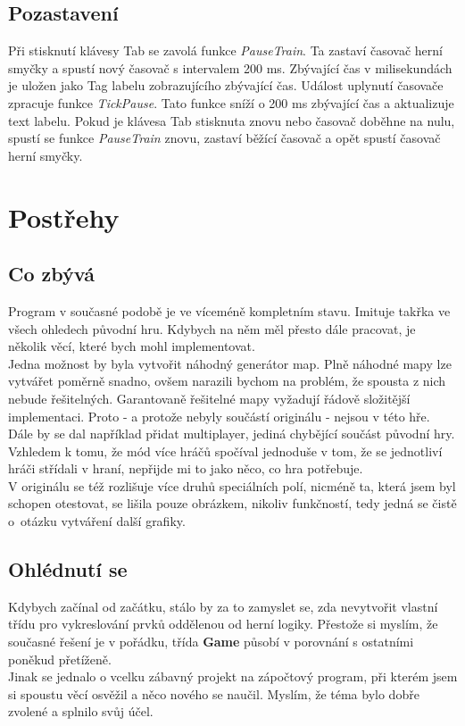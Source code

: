 \documentclass[11pt,a4paper]{scrreprt}
\begin{document}
\section{Pozastavení}
Při stisknutí klávesy Tab se zavolá funkce \textit{PauseTrain}. Ta zastaví časovač herní smyčky a spustí nový časovač s intervalem 200 ms. Zbývající čas v milisekundách je uložen jako Tag labelu zobrazujícího zbývající čas. Událost uplynutí časovače zpracuje funkce \textit{TickPause}. Tato funkce sníží o 200 ms zbývající čas a aktualizuje text labelu. Pokud je klávesa Tab stisknuta znovu nebo časovač doběhne na nulu, spustí se funkce \textit{PauseTrain} znovu, zastaví běžící časovač a opět spustí časovač herní smyčky.

\chapter{Postřehy}
\section{Co zbývá}
Program v současné podobě je ve víceméně kompletním stavu. Imituje takřka ve všech ohledech původní hru. Kdybych na něm měl přesto dále pracovat, je několik věcí, které bych mohl implementovat. \\

Jedna možnost by byla vytvořit náhodný generátor map. Plně náhodné mapy lze vytvářet poměrně snadno, ovšem narazili bychom na problém, že spousta z nich nebude řešitelných. Garantovaně řešitelné mapy vyžadují řádově složitější implementaci. Proto - a protože nebyly součástí originálu - nejsou v této hře.\\

Dále by se dal například přidat multiplayer, jediná chybějící součást původní hry. Vzhledem k tomu, že mód více hráčů spočíval jednoduše v tom, že se jednotliví hráči střídali v hraní, nepřijde mi to jako něco, co hra potřebuje.\\

V originálu se též rozlišuje více druhů speciálních polí, nicméně ta, která jsem byl schopen otestovat, se lišila pouze obrázkem, nikoliv funkčností, tedy jedná se čistě o~otázku vytváření další grafiky.

\section{Ohlédnutí se}
Kdybych začínal od začátku, stálo by za to zamyslet se, zda nevytvořit vlastní třídu pro vykreslování prvků oddělenou od herní logiky. Přestože si myslím, že současné řešení je v pořádku, třída \textbf{Game} působí v porovnání s ostatními poněkud přetíženě.\\

Jinak se jednalo o vcelku zábavný projekt na zápočtový program, při kterém jsem si spoustu věcí osvěžil a něco nového se naučil. Myslím, že téma bylo dobře zvolené a splnilo svůj účel.
\end{document}
